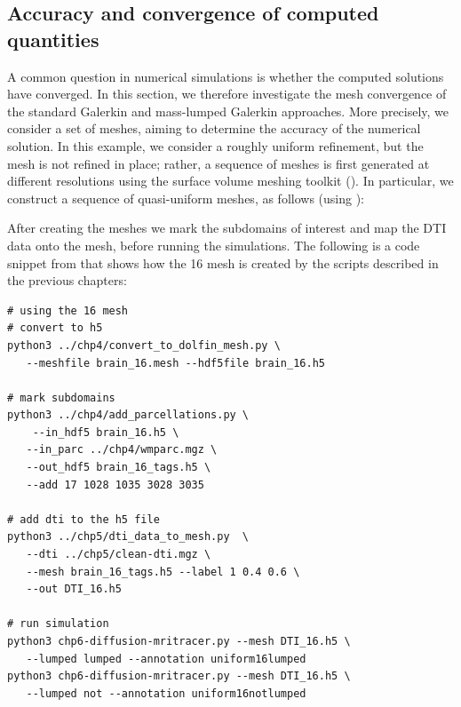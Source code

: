 \subsection{Accuracy and convergence of computed quantities} 


A common question in numerical simulations is whether the computed
solutions have converged. In this section, we therefore investigate
the mesh convergence of the standard Galerkin and mass-lumped Galerkin
approaches. More precisely, we consider a set of meshes, aiming to
determine the accuracy of the numerical solution. In this example, we
consider a roughly uniform refinement, but the mesh is not refined in
place; rather, a sequence of meshes is first generated at different
resolutions using the surface volume meshing toolkit (\svmtk). In
particular, we construct a sequence of quasi-uniform meshes, as
follows (using ):

After creating the meshes we mark the subdomains of interest and map the DTI data onto the mesh, before 
running the simulations. The following is a code snippet from  that shows how
the 16 mesh is created by the scripts described in the previous chapters: 
\begin{lstlisting}[style=bashStyle]
# using the 16 mesh 
# convert to h5
python3 ../chp4/convert_to_dolfin_mesh.py \
   --meshfile brain_16.mesh --hdf5file brain_16.h5

# mark subdomains  
python3 ../chp4/add_parcellations.py \
    --in_hdf5 brain_16.h5 \
   --in_parc ../chp4/wmparc.mgz \
   --out_hdf5 brain_16_tags.h5 \
   --add 17 1028 1035 3028 3035

# add dti to the h5 file 
python3 ../chp5/dti_data_to_mesh.py  \
   --dti ../chp5/clean-dti.mgz \
   --mesh brain_16_tags.h5 --label 1 0.4 0.6 \
   --out DTI_16.h5 

# run simulation 
python3 chp6-diffusion-mritracer.py --mesh DTI_16.h5 \
   --lumped lumped --annotation uniform16lumped 
python3 chp6-diffusion-mritracer.py --mesh DTI_16.h5 \
   --lumped not --annotation uniform16notlumped 
\end{lstlisting}


